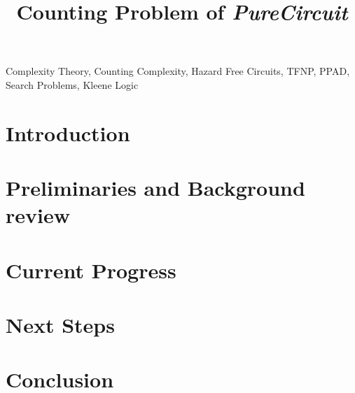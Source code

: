 \documentclass[onecolumn]{IEEEtran}
\begin{document}
\title{Counting Problem of \textit{PureCircuit}}

\author{
}

\maketitle

\begin{abstract}

\end{abstract}

\begin{IEEEkeywords} %
    Complexity Theory, Counting Complexity, Hazard Free Circuits, TFNP, PPAD, Search Problems, Kleene Logic
\end{IEEEkeywords}

\section{Introduction}


\section{Preliminaries and Background review}


\section{Current Progress}


\section{Next Steps}



% 
%
%
% 

\section{Conclusion} 

    


\end{document}
